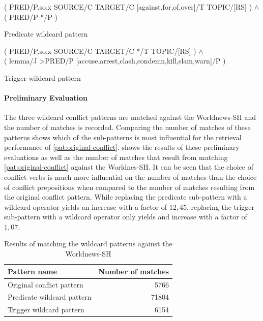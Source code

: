 \documentclass[11pt]{scrreprt}
\begin{document}
\begin{pattern}
  \normalfont\sffamily
  \centering
  ( PRED/P.{so,x} SOURCE/C TARGET/C [against,for,of,over]/T TOPIC/[RS] ) \(\wedge\) \\ ( PRED/P */P )
  \caption{Predicate wildcard pattern}
  \label{pat:wildcard-pred}
\end{pattern}

\begin{pattern}
  \normalfont\sffamily
  \centering
  ( PRED/P.{so,x} SOURCE/C TARGET/C */T TOPIC/[RS] ) \(\wedge\) \\  ( lemma/J >PRED/P [accuse,arrest,clash,condemn,kill,slam,warn]/P )
  \caption{Trigger wildcard pattern}
  \label{pat:wildcard-prep}
\end{pattern}


\paragraph{Preliminary Evaluation}
The three wildcard conflict patterns are matched against the Worldnews-SH and the number of matches is recorded. Comparing the number of matches of these patterns shows which of the sub-patterns is most influential for the retrieval performance of \cref{pat:original-conflict}.  shows the results of these preliminary evaluations as well as the number of matches that result from matching \cref{pat:original-conflict} against the Worldnes-SH. It can be seen that the choice of conflict verbs is much more influential on the number of matches than the choice of conflict prepositions when compared to the number of matches resulting from the original conflict pattern. While replacing the predicate sub-pattern with a wildcard operator yields an increase with a factor of \(12,45\), replacing the trigger sub-pattern with a wildcard operator only yields and increase with a factor of \(1,07\). 


\begin{table}[h]
\centering
\begin{tabular}{lr}
\toprule
\multicolumn{1}{l}{Pattern name}				& \multicolumn{1}{l}{Number of matches} \\
\midrule
Original conflict pattern					& 5766	\\
Predicate wildcard pattern					& 71804 \\
Trigger wildcard pattern						& 6154	\\
\bottomrule
\end{tabular}
\caption{Results of matching the wildcard patterns against the Worldnews-SH}
\label{tab:wildcard-pattern-evaluation}
\end{table}
\end{document}

